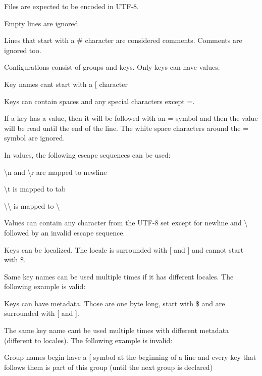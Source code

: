 \begin{DoxyItemize}
\item Files are expected to be encoded in {\ttfamily U\+T\+F-\/8}.
\item Empty lines are ignored.
\item Lines that start with a {\ttfamily \#} character are considered comments. Comments are ignored too.
\item Configurations consist of groups and keys. Only keys can have values.
\item Key names can\textquotesingle{}t start with a {\ttfamily \mbox{[}} character
\item Keys can contain spaces and any special characters except {\ttfamily =}.
\item If a key has a value, then it will be followed with an {\ttfamily =} symbol and then the value will be read until the end of the line. The white space characters around the {\ttfamily =} symbol are ignored.
\item In values, the following escape sequences can be used\+:
\begin{DoxyItemize}
\item {\ttfamily \textbackslash{}n} and {\ttfamily \textbackslash{}r} are mapped to newline
\item {\ttfamily \textbackslash{}t} is mapped to tab
\item {\ttfamily \textbackslash{}\textbackslash{}} is mapped to {\ttfamily \textbackslash{}}
\end{DoxyItemize}
\item Values can contain any character from the {\ttfamily U\+T\+F-\/8} set except for newline and {\ttfamily \textbackslash{}} followed by an invalid escape sequence.
\item Keys can be localized. The locale is surrounded with {\ttfamily \mbox{[}} and {\ttfamily \mbox{]}} and cannot start with {\ttfamily \$}.
\item Same key names can be used multiple times if it has different locales. The following example is valid\+: 
\begin{DoxyCode}{0}
\end{DoxyCode}

\item Keys can have metadata. Those are one byte long, start with {\ttfamily \$} and are surrounded with {\ttfamily \mbox{[}} and {\ttfamily \mbox{]}}.
\item The same key name can\textquotesingle{}t be used multiple times with different metadata (different to locales). The following example is invalid\+: 
\begin{DoxyCode}{0}
\end{DoxyCode}

\item Group names begin have a {\ttfamily \mbox{[}} symbol at the beginning of a line and every key that follows them is part of this group (until the next group is declared)
\end{DoxyItemize}

